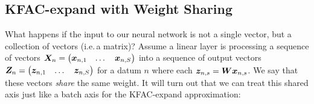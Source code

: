 \subsection{KFAC-expand with Weight Sharing}

What happens if the input to our neural network is not a single vector, but a collection of vectors (i.e.\,a matrix)? Assume a linear layer is processing a sequence of vectors ${\bm{X}}_n =
\begin{pmatrix} {\bm{x}}_{n,1} & \dots & {\bm{x}}_{n,S} \end{pmatrix}$ into a sequence of output vectors ${\bm{Z}}_n =
\begin{pmatrix} {\bm{z}}_{n,1} & \dots & {\bm{z}}_{n,S} \end{pmatrix}$ for a datum $n$ where each ${\bm{z}}_{n,s} = {\bm{W}} {\bm{x}}_{n,s}$.
We say that these vectors \emph{share} the same weight.
It will turn out that we can treat this shared axis just like a batch axis for the KFAC-expand approximation:

